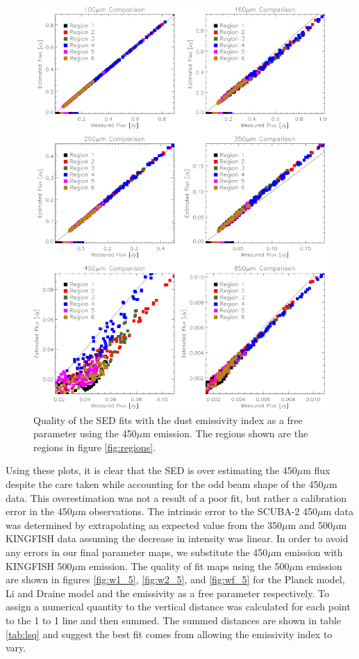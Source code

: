 \begin{figure}
  \centering
  \includegraphics[width=1.\textwidth]{sed_imgs/flux_compare_free_4.eps}
  \caption[Emissivity as a Free Parameter SED Fit Quality Using 450$\mu$m Data]{Quality of the SED fits with the dust emissivity index as a free parameter using the 450$\mu$m emission.  The regions shown are the regions in figure \ref{fig:regions}.}
  \label{fig:wf_4}
\end{figure}

Using these plots, it is clear that the SED is over estimating the 450$\mu$m flux despite the care taken while accounting for the odd beam shape of the 450$\mu$m data.  This overestimation was not a result of a poor fit, but rather a calibration error in the 450$\mu$m observations.  The intrinsic error to the SCUBA-2 450$\mu$m data was determined by extrapolating an expected value from the 350$\mu$m and 500$\mu$m KINGFISH data assuming the decrease in intensity was linear.  In order to avoid any errors in our final parameter maps, we substitute the 450$\mu$m emission with KINGFISH 500$\mu$m emission.  The quality of fit maps using the 500$\mu$m emission are shown in figures \ref{fig:w1_5}, \ref{fig:w2_5}, and \ref{fig:wf_5} for the Planck model, Li and Draine model and the emissivity as a free parameter respectively.  To assign a numerical quantity to the vertical distance was calculated for each point to the 1 to 1 line and then summed.  The summed distances are shown in table \ref{tab:lsq} and suggest the best fit comes from allowing the emissivity index to vary.

